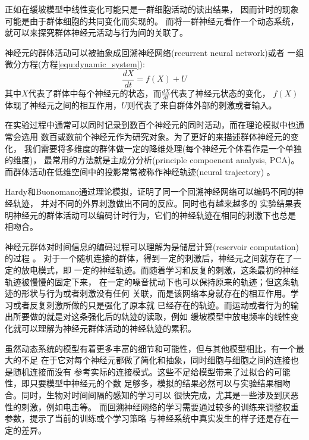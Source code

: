 
正如在缓坡模型中线性变化可能只是一群细胞活动的读出结果，
因而计时的现象可能是由于群体细胞的共同变化而实现的。
而将一群神经元看作一个动态系统，就可以来探究群体神经元活动与行为间的关联了。

神经元的群体活动可以被抽象成回溯神经网络(recurrent neural network)或者
一组微分方程(方程\ref{equ:dynamic_system}):
\begin{equation}
    \label{equ:dynamic_system}
    \frac{dX}{dt} = f(X) + U
\end{equation}
其中$X$代表了群体中每个神经元的状态，而$\frac{dX}{dt}$代表了神经元状态的变化，
$f(X)$体现了神经元之间的相互作用，$U$则代表了来自群体外部的刺激或者输入。

在实验过程中通常可以同时记录到数百个神经元的同时活动，而在理论模拟中也通常会选用
数百或数前个神经元作为研究对象。为了更好的来描述群体神经元的变化，
我们需要将多维度的群体做一定的降维处理(每个神经元个体看作是一个单独的维度)，
最常用的方法就是主成分分析(principle compoenent analysis, PCA)。
而群体活动在低维空间中的投影常常被称作神经轨迹(neural trajectory)
。

Hardy和Buonomano通过理论模拟，证明了同一个回溯神经网络可以编码不同的神经轨迹，
并对不同的外界刺激做出不同的反应。同时也有越来越多的
实验结果表明神经元的群体活动可以编码计时行为，它们的神经轨迹在相同的刺激下也总是
相吻合。

神经元群体对时间信息的编码过程可以理解为是储层计算(reservoir computation)的过程
。
对于一个随机连接的群体，得到一定的刺激后，神经元之间就存在了一定的放电模式，即
一定的神经轨迹。而随着学习和反复的刺激，这条最初的神经轨迹被慢慢的固定下来，
在一定的噪音扰动下也可以保持原来的轨迹；但这条轨迹的形状与行为或者刺激没有任何
关联，而是该网络本身就存在的相互作用。学习或者反复刺激所做的只是强化了原本就
已经存在的轨迹。而运动或者行为的输出所要做的就是对这条强化后的轨迹的读取，例如
缓坡模型中放电频率的线性变化就可以理解为神经元群体活动的神经轨迹的累积。




虽然动态系统的模型有着更多丰富的细节和可能性，但与其他模型相比，有一个最大的不足
在于它对每个神经元都做了简化和抽象，同时细胞与细胞之间的连接也是随机连接而没有
参考实际的连接模式。这些不足给模型带来了过拟合的可能性，即只要模型中神经元的个数
足够多，模拟的结果必然可以与实验结果相吻合。同时，生物对时间间隔的感知的学习可以
很快完成，尤其是一些涉及到厌恶性的刺激，例如电击等。
而回溯神经网络的学习需要通过较多的训练来调整权重参数，提示了当前的训练或个学习策略
与神经系统中真实发生的样子还是存在一定的差异。

